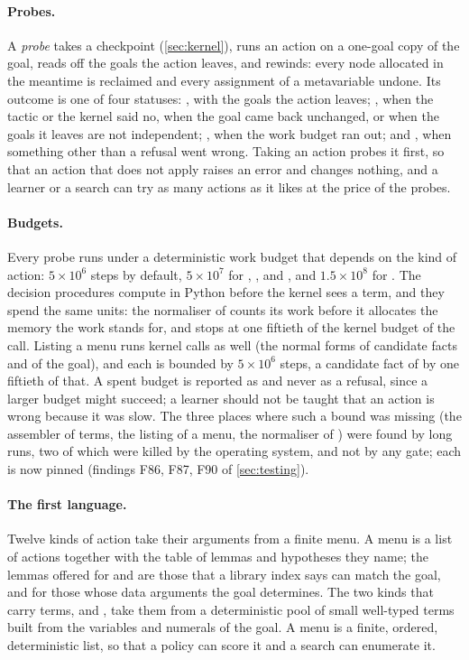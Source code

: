 \paragraph{Probes.}
A \emph{probe} takes a checkpoint (\cref{sec:kernel}), runs an action on a one-goal copy of the goal, reads off the goals the action leaves, and rewinds: every node allocated in the meantime is reclaimed and every assignment of a metavariable undone.
Its outcome is one of four statuses: , with the goals the action leaves; , when the tactic or the kernel said no, when the goal came back unchanged, or when the goals it leaves are not independent; , when the work budget ran out; and , when something other than a refusal went wrong.
Taking an action probes it first, so that an action that does not apply raises an error and changes nothing, and a learner or a search can try as many actions as it likes at the price of the probes.

\paragraph{Budgets.}
Every probe runs under a deterministic work budget that depends on the kind of action: $5\times10^6$ steps by default, $5\times10^7$ for , ,  and , and $1.5\times10^8$ for .
The decision procedures compute in Python before the kernel sees a term, and they spend the same units: the normaliser of  counts its work before it allocates the memory the work stands for, and stops at one fiftieth of the kernel budget of the call.
Listing a menu runs kernel calls as well (the normal forms of candidate facts and of the goal), and each is bounded by $5\times10^6$ steps, a candidate fact of  by one fiftieth of that.
A spent budget is reported as  and never as a refusal, since a larger budget might succeed; a learner should not be taught that an action is wrong because it was slow.
The three places where such a bound was missing (the assembler of terms, the listing of a menu, the normaliser of ) were found by long runs, two of which were killed by the operating system, and not by any gate; each is now pinned (findings F86, F87, F90 of \cref{sec:testing}).

\paragraph{The first language.}
Twelve kinds of action take their arguments from a finite menu.
A menu is a list of actions together with the table of lemmas and hypotheses they name; the lemmas offered for  and  are those that a library index says can match the goal, and for  those whose data arguments the goal determines.
The two kinds that carry terms,  and , take them from a deterministic pool of small well-typed terms built from the variables and numerals of the goal.
A menu is a finite, ordered, deterministic list, so that a policy can score it and a search can enumerate it.

